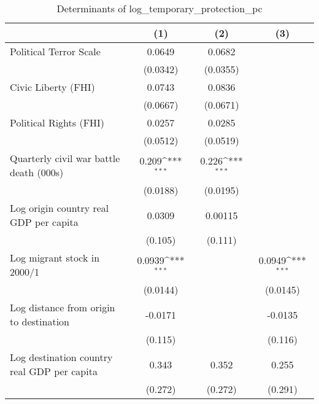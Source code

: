 \begin{table}[htbp]\centering
\def\sym#1{\ifmmode^{#1}\else\(^{#1}\)\fi}
\caption{Determinants of log\_temporary\_protection\_pc}
\begin{tabular}{l*{3}{c}}
\hline\hline
                    &\multicolumn{1}{c}{(1)}         &\multicolumn{1}{c}{(2)}         &\multicolumn{1}{c}{(3)}         \\
\hline
Political Terror Scale&      0.0649         &      0.0682         &                     \\
                    &    (0.0342)         &    (0.0355)         &                     \\
[1em]
Civic Liberty (FHI) &      0.0743         &      0.0836         &                     \\
                    &    (0.0667)         &    (0.0671)         &                     \\
[1em]
Political Rights (FHI)&      0.0257         &      0.0285         &                     \\
                    &    (0.0512)         &    (0.0519)         &                     \\
[1em]
Quarterly civil war battle death (000s)&       0.209\sym{***}&       0.226\sym{***}&                     \\
                    &    (0.0188)         &    (0.0195)         &                     \\
[1em]
Log origin country real GDP per capita&      0.0309         &     0.00115         &                     \\
                    &     (0.105)         &     (0.111)         &                     \\
[1em]
Log migrant stock in 2000/1&      0.0939\sym{***}&                     &      0.0949\sym{***}\\
                    &    (0.0144)         &                     &    (0.0145)         \\
[1em]
Log distance from origin to destination&     -0.0171         &                     &     -0.0135         \\
                    &     (0.115)         &                     &     (0.116)         \\
[1em]
Log destination country real GDP per capita&       0.343         &       0.352         &       0.255         \\
                    &     (0.272)         &     (0.272)         &     (0.291)         \\

\end{tabular}
\end{table}

